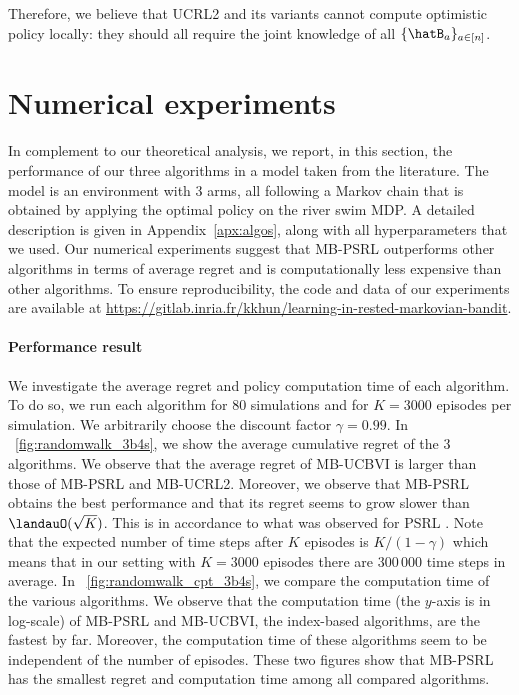 Therefore, we  believe that UCRL2 and its variants cannot compute optimistic  policy locally: they should all require the joint knowledge of all $\{\hatB_a\}_{a\in[n]}$.


\section{Numerical experiments}
\label{ch:rested:sec:numerical}

In complement to our theoretical analysis, we report, in this section, the performance of our three algorithms in a model taken from the literature. %
The model is an environment with 3 arms, all following a Markov chain that is obtained by applying the optimal policy on the river swim MDP. A detailed description is given in Appendix~\ref{apx:algos}, along with all hyperparameters that we used. Our numerical experiments suggest that MB-PSRL outperforms other algorithms in terms of average regret and is computationally less expensive than other algorithms. To ensure reproducibility, the code and data of our experiments are available at \url{https://gitlab.inria.fr/kkhun/learning-in-rested-markovian-bandit}.

\paragraph{Performance result}
We investigate the average regret and policy computation time of each algorithm.
To do so, we run each algorithm for $80$ simulations and for $K=3000$ episodes per simulation. We arbitrarily choose the discount factor $\gamma=0.99$. In \figurename~\ref{fig:randomwalk_3b4s}, we show the average cumulative regret of the 3 algorithms. We observe that the average regret of MB-UCBVI is larger than those of MB-PSRL and MB-UCRL2.
Moreover, we observe that MB-PSRL obtains the best performance and that its regret seems to grow slower than $\landauO(\sqrt{K})$. This is in accordance to what was observed for PSRL \cite{osband2013more}. 
Note that the expected number of time steps after $K$ episodes is $K/(1-\gamma)$ which means that in our setting with $K=3000$ episodes there are $300\,000$ time steps in average. 
In \figurename~\ref{fig:randomwalk_cpt_3b4s}, we compare the computation time of the various algorithms. We observe that the computation time (the $y$-axis is in log-scale) of MB-PSRL and MB-UCBVI, the index-based algorithms, are the fastest by far. 
Moreover, the computation time of these algorithms seem to be independent of the number of episodes. 
These two figures show that MB-PSRL has the smallest regret and computation time among all compared algorithms.

